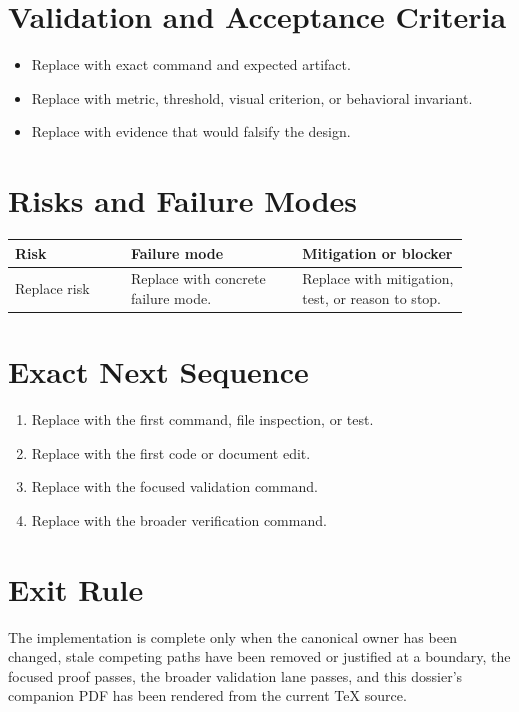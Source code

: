 \documentclass[11pt]{article}
\begin{document}
\section{Validation and Acceptance Criteria}
\begin{itemize}
  \item Replace with exact command and expected artifact.
  \item Replace with metric, threshold, visual criterion, or behavioral invariant.
  \item Replace with evidence that would falsify the design.
\end{itemize}

\section{Risks and Failure Modes}
\begin{longtable}{L{0.23\linewidth}L{0.34\linewidth}L{0.33\linewidth}}
\toprule
\textbf{Risk} & \textbf{Failure mode} & \textbf{Mitigation or blocker} \\
\midrule
\endhead
Replace risk & Replace with concrete failure mode. & Replace with mitigation, test, or reason to stop. \\
\bottomrule
\end{longtable}

\section{Exact Next Sequence}
\begin{enumerate}
  \item Replace with the first command, file inspection, or test.
  \item Replace with the first code or document edit.
  \item Replace with the focused validation command.
  \item Replace with the broader verification command.
\end{enumerate}

\section{Exit Rule}
The implementation is complete only when the canonical owner has been changed, stale competing paths have been removed or justified at a boundary, the focused proof passes, the broader validation lane passes, and this dossier's companion PDF has been rendered from the current TeX source.
\end{document}
